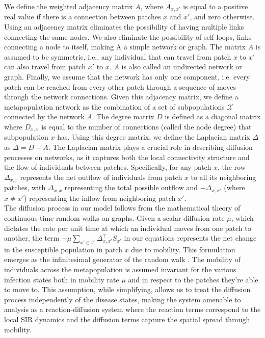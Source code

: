We define the weighted adjacency matrix $A$, where $A_{x,x'}$ is equal to a positive real value if there is a connection between patches $x$ and $x'$, and zero otherwise. Using an adjacency matrix eliminates the possibility of having multiple links connecting the same nodes. We also eliminate the possibility of self-loops, links connecting a node to itself, making A a simple network or graph. The matrix $A$ is assumed to be symmetric, i.e., any individual that can travel from patch $x$ to $x'$ can also travel from patch $x'$ to $x$. $A$ is also called an undirected network or graph. Finally, we assume that the network has only one component, i.e. every patch can be reached from every other patch through a sequence of moves through the network connections. Given this adjacency matrix, we define a metapopulation network as the combination of a set of subpopulations $\mathcal{X}$ connected by the network $A$.   The degree matrix $D$ is defined as a diagonal matrix where $D_{x,x}$ is equal to the number of connections (called the node degree) that subpopulation $x$ has. Using this degree matrix, we define the Laplacian matrix $\Delta$ as $\Delta = D - A$. The Laplacian matrix plays a crucial role in describing diffusion processes on networks, as it captures both the local connectivity structure and the flow of individuals between patches. Specifically, for any patch $x$, the row $\Delta_{x,:}$ represents the net outflow of individuals from patch $x$ to all its neighboring patches, with $\Delta_{x,x}$ representing the total possible outflow and $-\Delta_{x,x'}$ (where $x \neq x'$) representing the inflow from neighboring patch $x'$.\\

The diffusion process in our model follows from the mathematical theory of continuous-time random walks on graphs. Given a scalar diffusion rate $\mu$, which dictates the rate per unit time at which an individual moves from one patch to another, the term $-\mu \sum_{x' \in \mathcal{X}} \Delta_{x,x'}^{\top} S_{x'}$ in our equations represents the net change in the susceptible population in patch $x$ due to mobility. This formulation emerges as the infinitesimal generator of the random walk \cite{masuda2017random}. The mobility of individuals across the metapopulation is assumed invariant for the various infection states both in mobility rate $\mu$ and in respect to the patches they're able to move to. This assumption, while simplifying, allows us to treat the diffusion process independently of the disease states, making the system amenable to analysis as a reaction-diffusion system where the reaction terms correspond to the local SIR dynamics and the diffusion terms capture the spatial spread through mobility.

